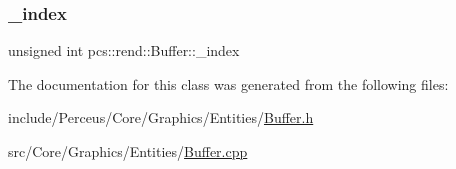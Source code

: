 \mbox{\label{classpcs_1_1rend_1_1Buffer_ae651e17a3f64d982b2bd1e39e91bc89c}} 
\subsubsection{\texorpdfstring{\+\_\+index}{\_index}}
{\footnotesize\ttfamily unsigned int pcs\+::rend\+::\+Buffer\+::\+\_\+index\hspace{0.3cm}{\ttfamily [private]}}



The documentation for this class was generated from the following files\+:\begin{DoxyCompactItemize}
\item 
include/\+Perceus/\+Core/\+Graphics/\+Entities/\hyperlink{Buffer_8h}{Buffer.\+h}\item 
src/\+Core/\+Graphics/\+Entities/\hyperlink{Buffer_8cpp}{Buffer.\+cpp}\end{DoxyCompactItemize}
